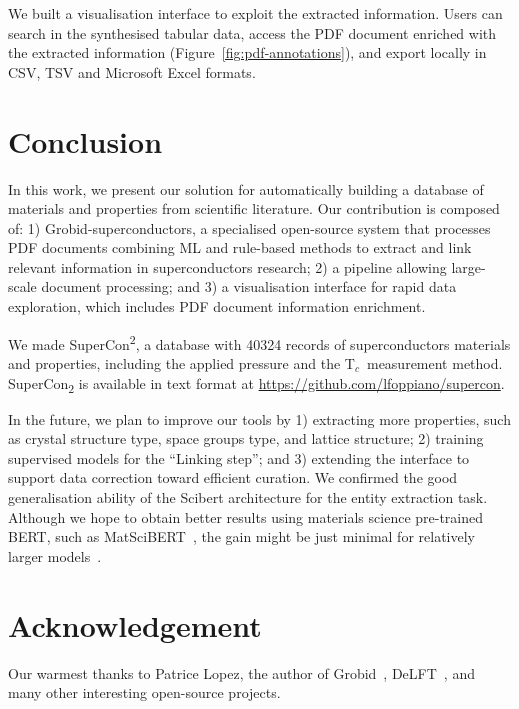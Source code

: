 \documentclass[]{interact}
\theoremstyle{plain}%
\theoremstyle{definition}
\theoremstyle{remark}
\newcommand{\tc}{T$_{c}$}
\begin{document}
We built a visualisation interface to exploit the extracted information.
Users can search in the synthesised tabular data, access the PDF document enriched with the extracted information (Figure~\ref{fig:pdf-annotations}), and export locally in CSV, TSV and Microsoft Excel formats.

\section{Conclusion}
\label{sec:conclusion}
In this work, we present our solution for automatically building a database of materials and properties from scientific literature.
Our contribution is composed of: 1) Grobid-superconductors, a specialised open-source system that processes PDF documents combining ML and rule-based methods to extract and link relevant information in superconductors research; 2) a pipeline allowing large-scale document processing; and 3) a visualisation interface for rapid data exploration, which includes PDF document information enrichment.

We made SuperCon\textsuperscript{2}, a database with 40324 records of superconductors materials and properties, including the applied pressure and the \tc~measurement method.
SuperCon\textsubscript{2} is available in text format at \url{https://github.com/lfoppiano/supercon}.

In the future, we plan to improve our tools by 1) extracting more properties, such as crystal structure type, space groups type, and lattice structure; 2) training supervised models for the ``Linking step''; and 3) extending the interface to support data correction toward efficient curation.
We confirmed the good generalisation ability of the Scibert architecture for the entity extraction task.
Although we hope to obtain better results using materials science pre-trained BERT, such as MatSciBERT~\cite{gupta_matscibert_2022}, the gain might be just minimal for relatively larger models~\cite{hong2022ScholarBERT}.

\section*{Acknowledgement}
\label{sec:acknowledgement}
Our warmest thanks to Patrice Lopez, the author of Grobid~\cite{GROBID}, DeLFT~\citep{DeLFT}, and many other interesting open-source projects.
\end{document}
